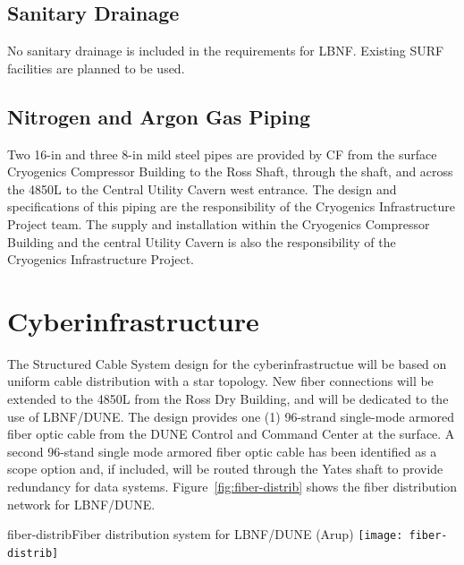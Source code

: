 \subsection{Sanitary Drainage}
\label{sec:fscf-und-san-drain}

No sanitary drainage is included in the requirements for LBNF. Existing SURF facilities are planned to be used.

\subsection{Nitrogen and Argon Gas Piping}
\label{sec:fscf-und-gas-piping}

Two 16-in and three 8-in mild steel pipes are provided by CF from the surface Cryogenics Compressor Building to the Ross Shaft, through the shaft, and across the 4850L to the Central Utility Cavern west entrance. The design and specifications of this piping are the responsibility of the Cryogenics Infrastructure Project team. The supply and installation within the Cryogenics Compressor Building and the central Utility Cavern is also the responsibility of the Cryogenics Infrastructure Project.

\section{Cyberinfrastructure}
\label{sec:fscf-und-cyber}

The Structured Cable System design for the cyberinfrastructue will be based on uniform cable distribution with a star topology. New fiber connections will be extended to the 4850L from the Ross Dry Building, and will be dedicated to the use of LBNF/DUNE. The design provides one (1) 96-strand single-mode armored fiber optic cable from the DUNE Control and Command Center at the surface. %
A second 96-stand single mode armored fiber optic cable has been identified as a scope option and, if included, will be routed through the Yates shaft to provide redundancy for data systems.  Figure~\ref{fig:fiber-distrib} shows the fiber distribution network for LBNF/DUNE.

\begin{cdrfigure}{fiber-distrib}{Fiber distribution system for LBNF/DUNE (Arup)}
\texttt{[image: fiber-distrib]}
\end{cdrfigure}

